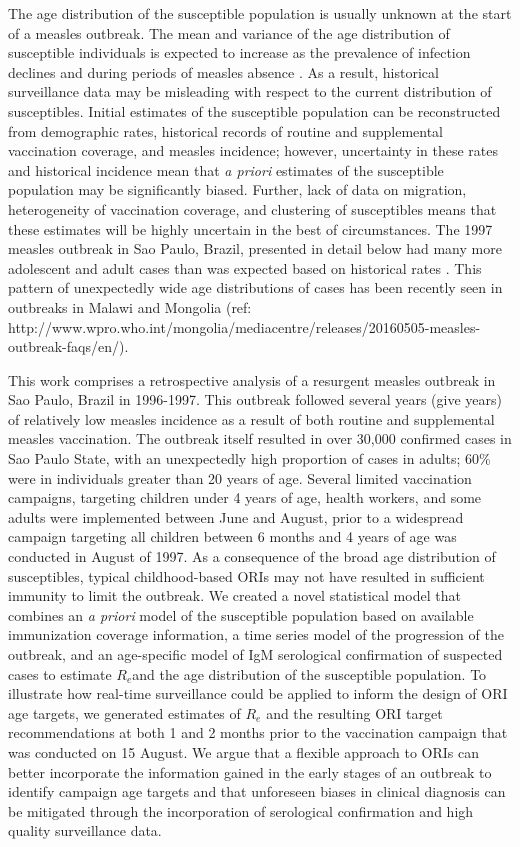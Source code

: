 The age distribution of the susceptible population is usually unknown at the start of a measles outbreak. The mean and variance of the age distribution of susceptible individuals is expected to increase as the prevalence of infection declines \cite{Goodson_2011, Ferrari_2013} and during periods of measles absence \cite{Durrheim_2014}. As a result, historical surveillance data may be misleading with respect to the current distribution of susceptibles. Initial estimates of the susceptible population can be reconstructed from demographic rates, historical records of routine and supplemental vaccination coverage, and measles incidence\cite{Takahashi_2015}; however, uncertainty in these rates and historical incidence mean that \emph{a priori} estimates of the susceptible population may be significantly biased. Further, lack of data on migration, heterogeneity of vaccination coverage, and clustering of susceptibles means that these estimates will be highly uncertain in the best of circumstances. The 1997 measles outbreak in Sao Paulo, Brazil, presented in detail below had many more adolescent and adult cases than was expected based on historical rates \cite{Camargo_2000}. This pattern of unexpectedly wide age distributions of cases has been recently seen in outbreaks in Malawi \cite{Minetti_2013} and Mongolia (ref: http://www.wpro.who.int/mongolia/mediacentre/releases/20160505-measles-outbreak-faqs/en/).

This work comprises a retrospective analysis of a resurgent measles outbreak in Sao Paulo, Brazil in 1996-1997. This outbreak followed several years (give years) of relatively low measles incidence as a result of both routine and supplemental measles vaccination. The outbreak itself resulted in over 30,000 confirmed cases in Sao Paulo State, with an unexpectedly high proportion of cases in adults; 60\% were in individuals greater than 20
years of age. Several limited vaccination campaigns, targeting children under 4 years of age, health workers, and some adults were implemented between June and August, prior to a widespread campaign targeting all children between 6 months and 4 years of age was conducted in August of 1997. As a consequence of the broad age distribution of susceptibles, typical childhood-based ORIs may not have resulted in sufficient immunity to limit the outbreak. We created a novel statistical model that combines an \emph{a priori} model of the susceptible population based on available immunization coverage information, a time series model of the progression of the outbreak, and an age-specific model of IgM serological confirmation of suspected cases to estimate \(R_{e}\)and the age distribution of the susceptible population. To illustrate how real-time surveillance could be applied to inform the design of ORI age targets, we generated estimates of \(R_{e}\) and the resulting ORI target recommendations at both 1 and 2 months prior to the vaccination campaign that was conducted on 15 August. We argue that a flexible approach to ORIs can better incorporate the information gained in the early stages of an
outbreak to identify campaign age targets and that unforeseen biases in clinical diagnosis can be mitigated through the incorporation of serological confirmation and high quality surveillance data.